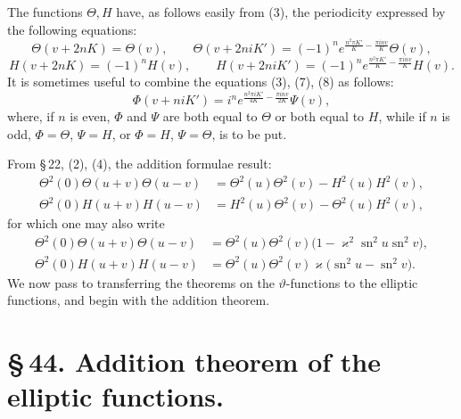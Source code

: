 \documentclass[11pt]{article}
\providecommand{\sn}{\operatorname{sn}}
\begin{document}
The functions $\Theta,H$ have, as follows easily from (3), the periodicity expressed by the following equations:
\begin{equation}
\Theta(v+2nK)=\Theta(v),
\qquad
\Theta(v+2niK')=(-1)^n e^{\frac{n^2\pi K'}{K}-\frac{\pi i n v}{K}}\Theta(v),
\tag{7}
\end{equation}
\begin{equation}
H(v+2nK)=(-1)^nH(v),
\qquad
H(v+2niK')=(-1)^n e^{\frac{n^2\pi K'}{K}-\frac{\pi i n v}{K}}H(v).
\tag{8}
\end{equation}
It is sometimes useful to combine the equations (3), (7), (8) as follows:
\begin{equation}
\Phi(v+niK')=i^n e^{\frac{n^2\pi iK'}{4K}-\frac{\pi inv}{2K}}\Psi(v),
\tag{9}
\end{equation}
where, if $n$ is even, $\Phi$ and $\Psi$ are both equal to $\Theta$ or both equal to $H$, while if $n$ is odd, $\Phi=\Theta$, $\Psi=H$, or $\Phi=H$, $\Psi=\Theta$, is to be put.

From \S\,22, (2), (4), the addition formulae result:
\begin{equation}
\begin{aligned}
\Theta^2(0)\Theta(u+v)\Theta(u-v)&=\Theta^2(u)\Theta^2(v)-H^2(u)H^2(v),\\
\Theta^2(0)H(u+v)H(u-v)&=H^2(u)\Theta^2(v)-\Theta^2(u)H^2(v),
\end{aligned}
\tag{10}
\end{equation}
for which one may also write
\begin{equation}
\begin{aligned}
\Theta^2(0)\Theta(u+v)\Theta(u-v)&=\Theta^2(u)\Theta^2(v)\bigl(1-\varkappa^2\sn^2u\sn^2v\bigr),\\
\Theta^2(0)H(u+v)H(u-v)&=\Theta^2(u)\Theta^2(v)\varkappa\bigl(\sn^2u-\sn^2v\bigr).
\end{aligned}
\tag{11}
\end{equation}
We now pass to transferring the theorems on the $\vartheta$-functions to the elliptic functions, and begin with the addition theorem.

\section*{\S\,44. Addition theorem of the elliptic functions.}
\end{document}
